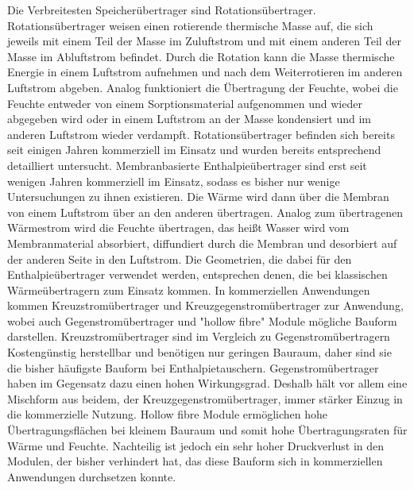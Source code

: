 \begin{normalsize}
\begin{LARGE}
Die Verbreitesten Speicherübertrager sind Rotationsübertrager. Rotationsübertrager weisen einen rotierende thermische Masse auf, die sich jeweils mit einem Teil der Masse im Zuluftstrom und mit einem anderen Teil der Masse im Abluftstrom befindet. Durch die Rotation kann die Masse thermische Energie in einem Luftstrom aufnehmen und nach dem Weiterrotieren im anderen Luftstrom abgeben. Analog funktioniert die Übertragung der Feuchte, wobei die Feuchte entweder von einem Sorptionsmaterial aufgenommen und wieder abgegeben wird oder in einem Luftstrom an der Masse kondensiert und im anderen Luftstrom wieder verdampft. Rotationsübertrager befinden sich bereits seit einigen Jahren kommerziell im Einsatz und wurden bereits entsprechend detailliert untersucht. %
Membranbasierte Enthalpieübertrager sind erst seit wenigen Jahren kommerziell im Einsatz, sodass es bisher nur wenige Untersuchungen zu ihnen existieren. Die Wärme wird dann über die Membran von einem Luftstrom über an den anderen übertragen. Analog zum übertragenen Wärmestrom wird die Feuchte übertragen, das heißt Wasser wird vom Membranmaterial absorbiert, diffundiert durch die Membran und desorbiert auf der anderen Seite in den Luftstrom. Die Geometrien, die dabei für den Enthalpieübertrager verwendet werden, entsprechen denen, die bei klassischen Wärmeübertragern zum Einsatz kommen. In kommerziellen Anwendungen kommen Kreuzstromübertrager und Kreuzgegenstromübertrager zur Anwendung, wobei auch Gegenstromübertrager und "hollow fibre" Module mögliche Bauform darstellen. Kreuzstromübertrager sind im Vergleich zu Gegenstromübertragern Kostengünstig herstellbar und benötigen nur geringen Bauraum, daher sind sie die bisher häufigste Bauform bei Enthalpietauschern. Gegenstromübertrager haben im Gegensatz dazu einen hohen Wirkungsgrad. Deshalb hält vor allem eine Mischform aus beidem, der Kreuzgegenstromübertrager, immer stärker Einzug in die kommerzielle Nutzung. Hollow fibre Module ermöglichen hohe Übertragungsflächen bei kleinem Bauraum und somit hohe Übertragungsraten für Wärme und Feuchte. Nachteilig ist jedoch ein sehr hoher Druckverlust in den Modulen, der bisher verhindert hat, das diese Bauform sich in kommerziellen Anwendungen durchsetzen konnte. 


\end{LARGE}
\end{normalsize}
